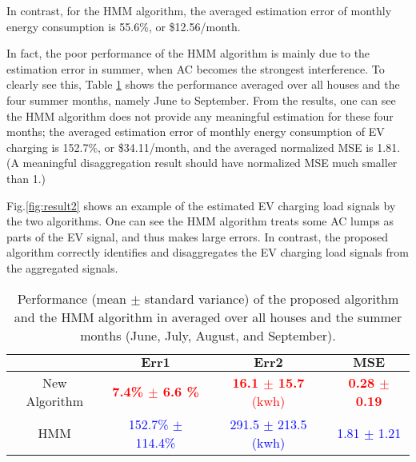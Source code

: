 \documentclass[conference]{IEEEtran}
\begin{document}
In contrast, for the HMM algorithm, the averaged estimation error of monthly energy consumption is 55.6\%, or \$12.56/month.

In fact, the poor performance of the HMM algorithm is mainly due to the estimation error in summer, when AC becomes the strongest interference. To clearly see this, Table \ref{Table2} shows the performance averaged over all houses and the four summer months, namely June to September. From the results, one can see the HMM algorithm does not provide any meaningful estimation for these four months; the averaged estimation error of monthly energy consumption of EV charging is 152.7\%, or \$34.11/month, and the averaged normalized MSE is 1.81. (A meaningful disaggregation result should have normalized MSE much smaller than 1.)


Fig.\ref{fig:result2} shows an example of the estimated EV charging load signals by the two algorithms. One can see the HMM algorithm treats some AC lumps as parts of the EV signal, and thus makes large errors. In contrast, the proposed algorithm correctly identifies and disaggregates the EV charging load signals from the aggregated signals.




\begin{table}[t]
\caption{Performance (mean $\pm$ standard variance) of the proposed algorithm and the HMM algorithm in \cite{parson2012non} averaged over all houses and the summer months (June, July, August, and September). }
\label{Table2}
\centering
\begin{tabular}{c|c|c|c}
\hline\hline
            &     $\mathrm{\textbf{Err1}}$      &   $\mathrm{\textbf{Err2}}$        & $\mathrm{\textbf{MSE}}$     \\
\hline
New Algorithm              &   \textcolor{red}{\textbf{7.4\% $\pm$ 6.6 \%}}       & \textcolor{red}{\textbf{16.1 $\pm$ 15.7} (kwh) }        & \textcolor{red}{\textbf{0.28 $\pm$ 0.19} }          \\ \hline
HMM \cite{parson2012non}   &    \textcolor{blue}{152.7\% $\pm$ 114.4\% }      & \textcolor{blue}{ 291.5 $\pm$ 213.5 (kwh)}   &  \textcolor{blue}{1.81 $\pm$ 1.21 }                  \\
\hline\hline
\end{tabular}
\end{table}
\end{document}
